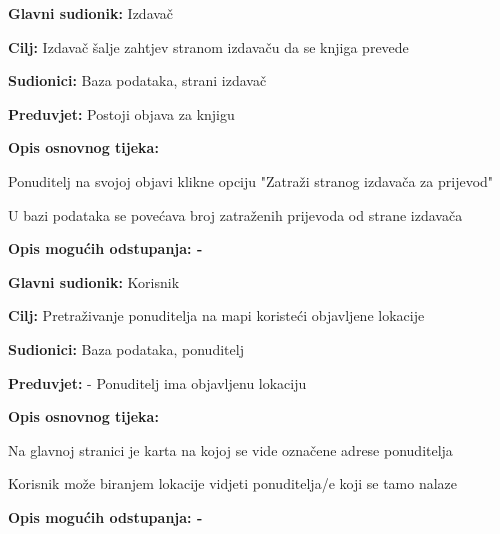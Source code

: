                     \noindent {}
					\begin{packed_item}
	
						\item \textbf{Glavni sudionik: } Izdavač
						\item  \textbf{Cilj:} Izdavač šalje zahtjev stranom izdavaču da se knjiga prevede
						\item  \textbf{Sudionici:} Baza podataka, strani izdavač
						\item  \textbf{Preduvjet:} Postoji objava za knjigu
						\item  \textbf{Opis osnovnog tijeka:}
						
						\item[] \begin{packed_enum}
	
							\item Ponuditelj na svojoj objavi klikne opciju "Zatraži stranog izdavača za prijevod"
                            					\item U bazi podataka se povećava broj zatraženih prijevoda od strane izdavača
						\end{packed_enum}
						
						\item  \textbf{Opis mogućih odstupanja: -}
					\end{packed_item}

                    \noindent {}
					\begin{packed_item}
	
						\item \textbf{Glavni sudionik: } Korisnik
						\item  \textbf{Cilj:} Pretraživanje ponuditelja na mapi koristeći objavljene lokacije
						\item  \textbf{Sudionici:} Baza podataka, ponuditelj
						\item  \textbf{Preduvjet:} - Ponuditelj ima objavljenu lokaciju
						\item  \textbf{Opis osnovnog tijeka:}
						
						\item[] \begin{packed_enum}	
							\item Na glavnoj stranici je karta na kojoj se vide označene adrese ponuditelja
                            					\item Korisnik može biranjem lokacije vidjeti ponuditelja/e koji se tamo nalaze
						\end{packed_enum}
						
						\item  \textbf{Opis mogućih odstupanja: -}
					\end{packed_item}

